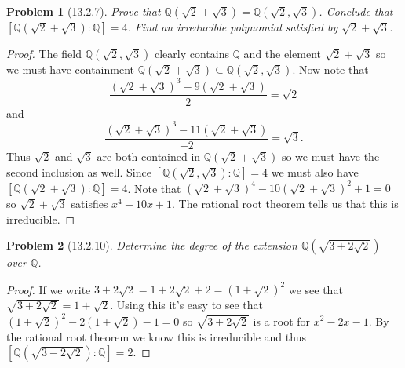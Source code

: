 \documentclass{article}
\newtheorem{problem}{Problem}
\begin{document}
\begin{problem}[13.2.7]
Prove that $\mathbb{Q}(\sqrt{2} + \sqrt{3}) = \mathbb{Q}(\sqrt{2},\sqrt{3})$. Conclude that $[\mathbb{Q}(\sqrt{2} + \sqrt{3}) : \mathbb{Q}] = 4$. Find an irreducible polynomial satisfied by $\sqrt{2} + \sqrt{3}$.
\end{problem}
\begin{proof}
The field $\mathbb{Q}(\sqrt{2},\sqrt{3})$ clearly contains $\mathbb{Q}$ and the element $\sqrt{2} + \sqrt{3}$ so we must have containment $\mathbb{Q}(\sqrt{2} + \sqrt{3}) \subseteq \mathbb{Q}(\sqrt{2}, \sqrt{3})$. Now note that
\[
\frac{ \left ( \sqrt{2} + \sqrt{3} \right )^3 - 9 \left ( \sqrt{2} + \sqrt{3} \right ) }{2} = \sqrt{2}
\]
and
\[
\frac{ \left ( \sqrt{2} + \sqrt{3} \right )^3 - 11 \left ( \sqrt{2} + \sqrt{3} \right ) }{-2} = \sqrt{3}.
\]
Thus $\sqrt{2}$ and $\sqrt{3}$ are both contained in $\mathbb{Q}(\sqrt{2} + \sqrt{3})$ so we must have the second inclusion as well. Since $[\mathbb{Q}(\sqrt{2}, \sqrt{3}) : \mathbb{Q}] = 4$ we must also have $[\mathbb{Q}(\sqrt{2} + \sqrt{3}) : \mathbb{Q}] = 4$. Note that $(\sqrt{2} + \sqrt{3})^4 - 10(\sqrt{2}+\sqrt{3})^2 + 1 = 0$ so $\sqrt{2} + \sqrt{3}$ satisfies $x^4 - 10x + 1$. The rational root theorem tells us that this is irreducible.
\end{proof}

\begin{problem}[13.2.10]
Determine the degree of the extension $\mathbb{Q}(\sqrt{3 + 2\sqrt{2}})$ over $\mathbb{Q}$.
\end{problem}
\begin{proof}
If we write $3 + 2 \sqrt{2} = 1 + 2 \sqrt{2} + 2 = (1 + \sqrt{2})^2$ we see that $\sqrt{3 + 2\sqrt{2}} = 1 + \sqrt{2}$. Using this it's easy to see that $(1+\sqrt{2})^2 - 2 (1 + \sqrt{2}) - 1 = 0$ so $\sqrt{3 + 2 \sqrt{2}}$ is a root for $x^2 - 2x - 1$. By the rational root theorem we know this is irreducible and thus $[\mathbb{Q}(\sqrt{3 - 2\sqrt{2}}) : \mathbb{Q}] = 2$.
\end{proof}
\end{document}
